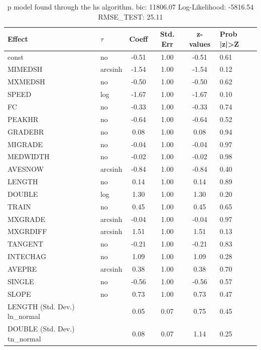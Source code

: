 \begin{table}
	\caption{p model found through the hs algorithm. bic: 11806.07 Log-Likelihood: -5816.54 RMSE_TEST: 25.11}
	\begin{center}
		\begin{tabular}{|l|l|c|c|c|l|}
			\hline
			Effect & $\tau$ & Coeff & Std. Err & z-values & Prob |z|>Z \\
			\hline
			const & no & -0.51 & 1.00 & -0.51 & 0.61 \\
			\hline
			MIMEDSH & arcsinh & -1.54 & 1.00 & -1.54 & 0.12 \\
			\hline
			MXMEDSH & no & -0.50 & 1.00 & -0.50 & 0.62 \\
			\hline
			SPEED & log & -1.67 & 1.00 & -1.67 & 0.10 \\
			\hline
			FC & no & -0.33 & 1.00 & -0.33 & 0.74 \\
			\hline
			PEAKHR & no & -0.64 & 1.00 & -0.64 & 0.52 \\
			\hline
			GRADEBR & no & 0.08 & 1.00 & 0.08 & 0.94 \\
			\hline
			MIGRADE & no & -0.04 & 1.00 & -0.04 & 0.97 \\
			\hline
			MEDWIDTH & no & -0.02 & 1.00 & -0.02 & 0.98 \\
			\hline
			AVESNOW & arcsinh & -0.84 & 1.00 & -0.84 & 0.40 \\
			\hline
			LENGTH & no & 0.14 & 1.00 & 0.14 & 0.89 \\
			\hline
			DOUBLE & log & 1.30 & 1.00 & 1.30 & 0.20 \\
			\hline
			TRAIN & no & 0.45 & 1.00 & 0.45 & 0.65 \\
			\hline
			MXGRADE & arcsinh & -0.04 & 1.00 & -0.04 & 0.97 \\
			\hline
			MXGRDIFF & arcsinh & 1.51 & 1.00 & 1.51 & 0.13 \\
			\hline
			TANGENT & no & -0.21 & 1.00 & -0.21 & 0.83 \\
			\hline
			INTECHAG & no & 1.09 & 1.00 & 1.09 & 0.28 \\
			\hline
			AVEPRE & arcsinh & 0.38 & 1.00 & 0.38 & 0.70 \\
			\hline
			SINGLE & no & -0.56 & 1.00 & -0.56 & 0.57 \\
			\hline
			SLOPE & no & 0.73 & 1.00 & 0.73 & 0.47 \\
			\hline
			LENGTH (Std. Dev.) ln_normal &  & 0.05 & 0.07 & 0.75 & 0.45 \\
			\hline
			DOUBLE (Std. Dev.) tn_normal &  & 0.08 & 0.07 & 1.14 & 0.25 \\

\end{tabular}
\end{center}
\end{table}
